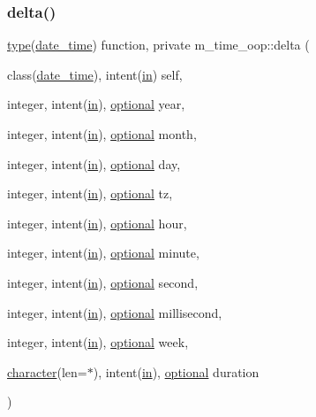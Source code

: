 \subsubsection{\texorpdfstring{delta()}{delta()}}
{\footnotesize\ttfamily \hyperlink{stop__watch_83_8txt_a70f0ead91c32e25323c03265aa302c1c}{type}(\hyperlink{structm__time__oop_1_1date__time}{date\+\_\+time}) function, private m\+\_\+time\+\_\+oop\+::delta (\begin{DoxyParamCaption}\item[{class(\hyperlink{structm__time__oop_1_1date__time}{date\+\_\+time}), intent(\hyperlink{M__journal_83_8txt_afce72651d1eed785a2132bee863b2f38}{in})}]{self,  }\item[{integer, intent(\hyperlink{M__journal_83_8txt_afce72651d1eed785a2132bee863b2f38}{in}), \hyperlink{option__stopwatch_83_8txt_aa4ece75e7acf58a4843f70fe18c3ade5}{optional}}]{year,  }\item[{integer, intent(\hyperlink{M__journal_83_8txt_afce72651d1eed785a2132bee863b2f38}{in}), \hyperlink{option__stopwatch_83_8txt_aa4ece75e7acf58a4843f70fe18c3ade5}{optional}}]{month,  }\item[{integer, intent(\hyperlink{M__journal_83_8txt_afce72651d1eed785a2132bee863b2f38}{in}), \hyperlink{option__stopwatch_83_8txt_aa4ece75e7acf58a4843f70fe18c3ade5}{optional}}]{day,  }\item[{integer, intent(\hyperlink{M__journal_83_8txt_afce72651d1eed785a2132bee863b2f38}{in}), \hyperlink{option__stopwatch_83_8txt_aa4ece75e7acf58a4843f70fe18c3ade5}{optional}}]{tz,  }\item[{integer, intent(\hyperlink{M__journal_83_8txt_afce72651d1eed785a2132bee863b2f38}{in}), \hyperlink{option__stopwatch_83_8txt_aa4ece75e7acf58a4843f70fe18c3ade5}{optional}}]{hour,  }\item[{integer, intent(\hyperlink{M__journal_83_8txt_afce72651d1eed785a2132bee863b2f38}{in}), \hyperlink{option__stopwatch_83_8txt_aa4ece75e7acf58a4843f70fe18c3ade5}{optional}}]{minute,  }\item[{integer, intent(\hyperlink{M__journal_83_8txt_afce72651d1eed785a2132bee863b2f38}{in}), \hyperlink{option__stopwatch_83_8txt_aa4ece75e7acf58a4843f70fe18c3ade5}{optional}}]{second,  }\item[{integer, intent(\hyperlink{M__journal_83_8txt_afce72651d1eed785a2132bee863b2f38}{in}), \hyperlink{option__stopwatch_83_8txt_aa4ece75e7acf58a4843f70fe18c3ade5}{optional}}]{millisecond,  }\item[{integer, intent(\hyperlink{M__journal_83_8txt_afce72651d1eed785a2132bee863b2f38}{in}), \hyperlink{option__stopwatch_83_8txt_aa4ece75e7acf58a4843f70fe18c3ade5}{optional}}]{week,  }\item[{\hyperlink{option__stopwatch_83_8txt_abd4b21fbbd175834027b5224bfe97e66}{character}(len=$\ast$), intent(\hyperlink{M__journal_83_8txt_afce72651d1eed785a2132bee863b2f38}{in}), \hyperlink{option__stopwatch_83_8txt_aa4ece75e7acf58a4843f70fe18c3ade5}{optional}}]{duration }\end{DoxyParamCaption})\hspace{0.3cm}{\ttfamily [private]}}



